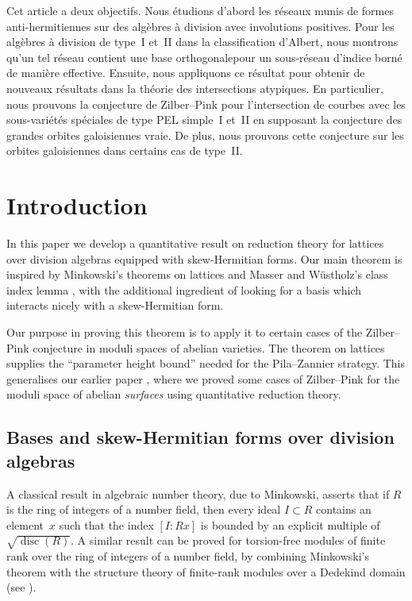 \documentclass[JEP,XML,SOM,Unicode,NoFloatCountersInSection]{cedram}
\DeclareMathOperator{\disc}{disc}
\begin{document}
\begin{altabstract}
Cet article a deux objectifs. Nous étudions d'abord les réseaux munis de formes anti-hermitiennes sur des algèbres à division avec involutions positives. Pour les algèbres à division de type~I et~II dans la classification d'Albert, nous montrons qu'un tel réseau contient une base \og orthogonale\fg pour un sous-réseau d'indice borné de manière effective. Ensuite, nous appliquons ce résultat pour obtenir de nouveaux résultats dans la théorie des intersections atypiques. En particulier, nous prouvons la conjecture de Zilber--Pink pour l'intersection de courbes avec les sous-variétés spéciales de type PEL simple~I et~II en supposant la conjecture des grandes orbites galoisiennes vraie. De plus, nous prouvons cette conjecture sur les orbites galoisiennes dans certains cas de type~II.
\end{altabstract}
\maketitle
\vspace*{-\baselineskip}%
\tableofcontents
\mainmatter

\section{Introduction}

In this paper we develop a quantitative result on reduction theory for lattices over division algebras equipped with skew-Hermitian forms. Our main theorem is inspired by Minkowski's theorems on lattices and Masser and Wüstholz's class index lemma \cite{MW95}, with the additional ingredient of looking for a basis which interacts nicely with a skew-Hermitian form.

Our purpose in proving this theorem is to apply it to certain cases of the Zilber--Pink conjecture in moduli spaces of abelian varieties. The theorem on lattices supplies the ``parameter height bound'' needed for the Pila--Zannier strategy.
This generalises our earlier paper \cite{QRTUI}, where we proved some cases of Zilber--Pink for the moduli space of abelian \textit{surfaces} using quantitative reduction theory.

\subsection{Bases and skew-Hermitian forms over division algebras}

A classical result in algebraic number theory, due to Minkowski, asserts that if $R$ is the ring of integers of a number field, then every ideal $I \subset R$ contains an element~$x$ such that the index $[I:Rx]$ is bounded by an explicit multiple of $\sqrt{\disc(R)}$.
A similar result can be proved for torsion-free modules of finite rank over the ring of integers of a number field, by combining Minkowski's theorem with the structure theory of finite-rank modules over a Dedekind domain (see \cite[\S 22, Ex.\,6]{CR62}).
\end{document}
